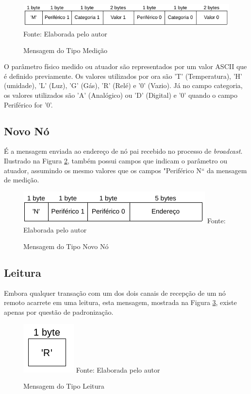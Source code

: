 {\begin{figure}[h!]
	\caption{Mensagem do Tipo Medição}
	\centering
	\includegraphics[scale=0.5]{../images/mensagem_medida.png}
	\hspace{\linewidth}
	Fonte: Elaborada pelo autor
	\label{figura:message_measurement}
\end{figure}

O parâmetro físico medido ou atuador são representados por um valor ASCII que é definido previamente. Os valores utilizados
por ora são 'T' (Temperatura), 'H' (umidade), 'L' (Luz), 'G' (Gás), 'R' (Relé) e '0' (Vazio). Já no campo categoria, os
valores utilizados são 'A' (Analógico) ou 'D' (Digital) e '0' quando o campo Periférico for '0'.

\subsection{Novo Nó}
É a mensagem enviada ao endereço de nó pai recebido no processo de \textit{broadcast}. Ilustrado na Figura
\ref{figura:message_new_node}, também possui campos que indicam o parâmetro ou atuador, assumindo os mesmo
valores que os campos "Periférico N`` da mensagem de medição.

\begin{figure}[h!]
	\caption{Mensagem do Tipo Novo Nó}
	\centering
	\includegraphics[scale=0.5]{../images/mensagem_novo_no.png}
	\hspace{\linewidth}
	Fonte: Elaborada pelo autor
	\label{figura:message_new_node}
\end{figure}

\subsection{Leitura}
Embora qualquer transação com um dos dois canais de recepção de um nó remoto acarrete em uma leitura, esta
mensagem, mostrada na Figura \ref{figura:message_read}, existe apenas por questão de padronização.

\begin{figure}[h!]
	\caption{Mensagem do Tipo Leitura}
	\centering
	\includegraphics[scale=0.35]{../images/mensagem_leitura.png}
	\hspace{\linewidth}
	Fonte: Elaborada pelo autor
	\label{figura:message_read}
\end{figure}

}
